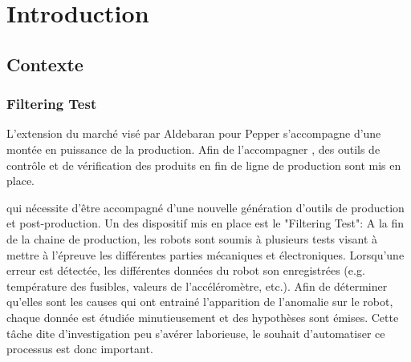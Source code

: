 \chapter{Introduction}
\label{Introduction}
\thispagestyle{fancy}

\section{Contexte}
\label{Introduction:Contexte}

\subsection{Filtering Test}
\label{Introduction:Contexte:Filtering Test}
L'extension du marché visé par Aldebaran pour Pepper s'accompagne d'une montée en puissance de la production. Afin de l'accompagner , des outils de contrôle et de vérification des produits en fin de ligne de production sont mis en place. 


 qui nécessite d'être accompagné d'une nouvelle génération d'outils de production et post-production. Un des dispositif mis en place est le "Filtering Test": A la fin de la chaine de production, les robots sont soumis à plusieurs tests visant à mettre à l'épreuve les différentes parties mécaniques et électroniques. Lorsqu'une erreur est détectée,  les différentes données du robot son enregistrées (e.g. température des fusibles, valeurs de l'accéléromètre, etc.). Afin de déterminer qu'elles sont les causes qui ont entrainé l'apparition de l'anomalie sur le robot, chaque donnée est étudiée minutieusement et des hypothèses sont émises. Cette tâche dite d'investigation peu s'avérer laborieuse, le souhait d'automatiser ce processus est donc important.